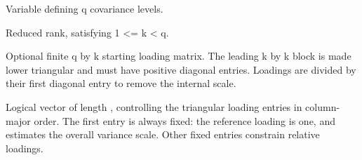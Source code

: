 \documentclass[a4paper]{book}
\begin{document}
\begin{Arguments}
\begin{ldescription}
\item[\code{x}] Variable defining q covariance levels.
\item[\code{k}] Reduced rank, satisfying 1 <= k < q.
\item[\code{loadings}] Optional finite q by k starting loading matrix. The leading
k by k block is made lower triangular and must have positive diagonal entries.
Loadings are divided by their first diagonal entry to remove the internal scale.
\item[\code{fixed}] Logical vector of length , controlling the
triangular loading entries in column-major order. The first entry is always
fixed: the reference loading is one, and  estimates the overall
variance scale. Other fixed entries constrain relative loadings.
\end{ldescription}
\end{Arguments}
%
\end{document}
